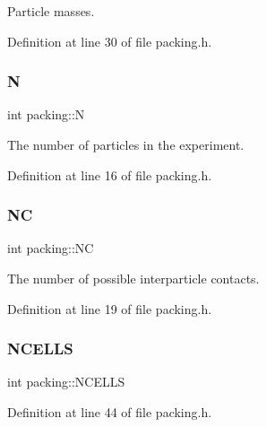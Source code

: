 Particle masses. 



Definition at line 30 of file packing.\+h.

\mbox{\label{classpacking_a282fd04f2195ce1535ef9a1eb0c3af40}} 
\subsubsection{\texorpdfstring{N}{N}}
{\footnotesize\ttfamily int packing\+::N\hspace{0.3cm}{\ttfamily [protected]}}



The number of particles in the experiment. 



Definition at line 16 of file packing.\+h.

\mbox{\label{classpacking_ad09604fb221c69596a95083c1c8c7d47}} 
\subsubsection{\texorpdfstring{NC}{NC}}
{\footnotesize\ttfamily int packing\+::\+NC\hspace{0.3cm}{\ttfamily [protected]}}



The number of possible interparticle contacts. 



Definition at line 19 of file packing.\+h.

\mbox{\label{classpacking_a212d4cc14a81cd3bb06ec7cbb5b74567}} 
\subsubsection{\texorpdfstring{N\+C\+E\+L\+LS}{NCELLS}}
{\footnotesize\ttfamily int packing\+::\+N\+C\+E\+L\+LS\hspace{0.3cm}{\ttfamily [protected]}}



Definition at line 44 of file packing.\+h.

\mbox{\label{classpacking_a9a8d986ed98d37a87ea3f3785c0ffe61}} 
